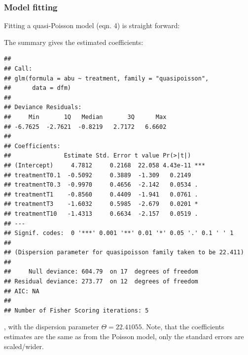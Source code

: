 \subsubsection{Model fitting}
Fitting a quasi-Poisson model (eqn. 4) is straight forward:
\begin{knitrout}
\color{fgcolor}\small\begin{kframe}
\begin{alltt}
 \hlkwb{<-}  \hlopt{~}     \hlstd{=} \hlstd{)}
\end{alltt}
\end{kframe}
\end{knitrout}

The summary gives the estimated coefficients:
\begin{knitrout}
\color{fgcolor}\small\begin{kframe}
\begin{alltt}
\end{alltt}
\begin{verbatim}
## 
## Call:
## glm(formula = abu ~ treatment, family = "quasipoisson", 
##      data = dfm)
## 
## Deviance Residuals: 
##     Min       1Q   Median       3Q      Max  
## -6.7625  -2.7621  -0.8219   2.7172   6.6602  
## 
## Coefficients:
##               Estimate Std. Error t value Pr(>|t|)    
## (Intercept)     4.7812     0.2168  22.058 4.43e-11 ***
## treatmentT0.1  -0.5092     0.3889  -1.309   0.2149    
## treatmentT0.3  -0.9970     0.4656  -2.142   0.0534 .  
## treatmentT1    -0.8560     0.4409  -1.941   0.0761 .  
## treatmentT3    -1.6032     0.5985  -2.679   0.0201 *  
## treatmentT10   -1.4313     0.6634  -2.157   0.0519 .  
## ---
## Signif. codes:  0 '***' 0.001 '**' 0.01 '*' 0.05 '.' 0.1 ' ' 1
## 
## (Dispersion parameter for quasipoisson family taken to be 22.411)
## 
##     Null deviance: 604.79  on 17  degrees of freedom
## Residual deviance: 273.77  on 12  degrees of freedom
## AIC: NA
## 
## Number of Fisher Scoring iterations: 5
\end{verbatim}
\end{kframe}
\end{knitrout}

, with the dispersion parameter $\Theta = 22.41055$. 
Note, that the coefficients estimates are the same as from the Poisson model, only the standard errors are scaled/wider.

